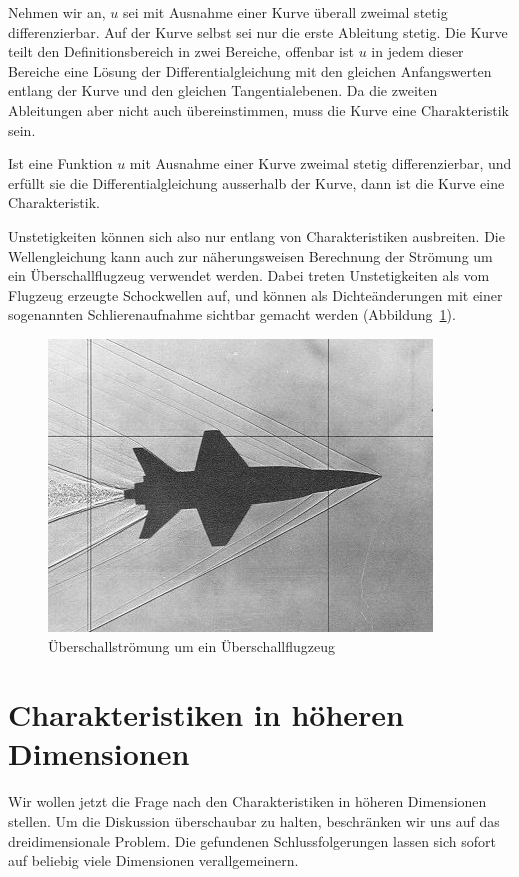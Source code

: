 Nehmen wir an, $u$ sei mit Ausnahme einer Kurve überall zweimal
stetig differenzierbar.
Auf der Kurve selbst sei nur die erste Ableitung stetig.
Die Kurve teilt den Definitionsbereich in zwei
Bereiche, offenbar ist $u$ in jedem dieser Bereiche eine 
Lösung der Differentialgleichung mit den gleichen Anfangswerten
entlang der Kurve und den gleichen Tangentialebenen.
Da die zweiten Ableitungen aber nicht auch übereinstimmen, muss
die Kurve eine Charakteristik sein.



\begin{satz}
Ist eine Funktion $u$ mit Ausnahme einer Kurve zweimal stetig
differenzierbar, und erfüllt sie die Differentialgleichung
ausserhalb der Kurve, dann ist die Kurve eine Charakteristik.
\end{satz}
Unstetigkeiten können sich also nur entlang von Charakteristiken
ausbreiten.
Die Wellengleichung kann auch zur näherungsweisen
Berechnung der Strömung um ein Überschallflugzeug verwendet werden.
Dabei treten Unstetigkeiten als vom Flugzeug erzeugte Schockwellen
auf, und können als Dichteänderungen mit einer
sogenannten Schlierenaufnahme sichtbar gemacht werden
(Abbildung~\ref{ueberschall2d}).

\begin{figure}
\begin{center}
\includegraphics[width=0.8\hsize]{../common/graphics/i-5-1}
\end{center}
\caption{Überschallströmung um ein Überschallflugzeug\label{ueberschall2d}}
\end{figure}

\section{Charakteristiken in höheren Dimensionen}
Wir wollen jetzt die Frage nach den Charakteristiken in höheren Dimensionen
stellen. Um die Diskussion überschaubar zu halten, beschränken wir uns auf
das dreidimensionale Problem. Die gefundenen Schlussfolgerungen 
lassen sich sofort auf beliebig viele Dimensionen verallgemeinern.

